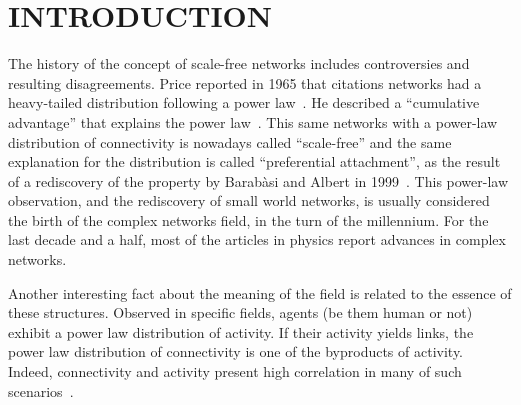 \documentclass[12pt,fleqn]{article}
\begin{document}
\section{INTRODUCTION}
The history of the concept of scale-free networks includes controversies and resulting disagreements.
Price reported in 1965 that citations networks had a heavy-tailed distribution following a power law~\cite{price1}.
He described a ``cumulative advantage'' that explains the power law~\cite{price2}.
This same networks with a power-law distribution of connectivity is nowadays called ``scale-free''
and the same explanation for the distribution is called ``preferential attachment'',
as the result of a rediscovery of the property by Barab\`asi and Albert in 1999~\cite{barabasi1}.
This power-law observation, and the rediscovery of small world networks,
is usually considered the birth of the complex networks field,
in the turn of the millennium.
For the last decade and a half,
most of the articles in physics report advances in complex networks.

Another interesting fact about the meaning of the field
is related to the essence of these structures.
Observed in specific fields,
agents (be them human or not) exhibit a power law distribution of activity.
If their activity yields links,
the power law distribution of connectivity is one of the byproducts of activity.
Indeed, connectivity and activity present high correlation in many of such scenarios~\citep{fabbri1,fabbri2,fabbri3}.
\end{document}
